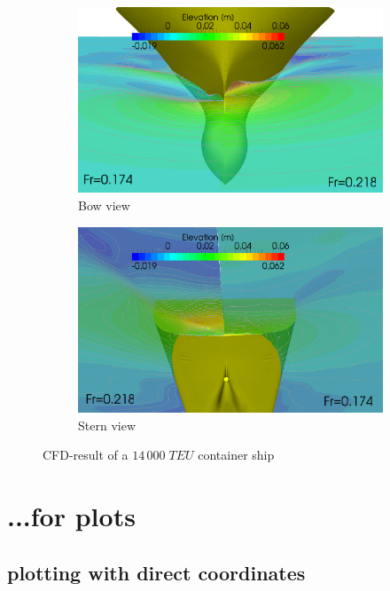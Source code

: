 \begin{figure}[ht]
    \centering
    \begin{subfigure}[ht]{.45\textwidth}
        \includegraphics[width=\textwidth]{./figures/bug.png}  
        \caption{Bow view}
        \label{fig:sub-bow}
    \end{subfigure}
    \hfill
    \begin{subfigure}[ht]{.45\textwidth}
        \includegraphics[width=\textwidth]{./figures/heck.png}  
        \caption{Stern view}
        \label{fig:sub-stern}
    \end{subfigure}
    \caption[CFD result]{CFD-result of a $14\,000\;TEU$ container ship}
    \label{fig:CFD}
\end{figure}

\clearpage

\section{...for plots}
\subsection{plotting with direct coordinates}

